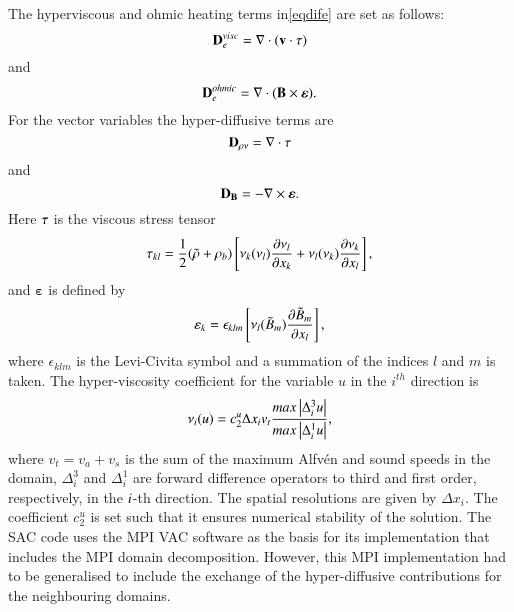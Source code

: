 \documentclass[final,1p]{elsarticle}
\begin{document}
The hyperviscous and ohmic heating terms in\eqref{eqdife} are set as follows:
\begin{equation}
{\bf D}_{e}^{visc}=\nabla \cdot ({\bf v}\cdot \tau )
\end{equation}
and
\begin{equation}
{\bf D}_{e}^{ohmic}=\nabla \cdot ({\bf B}\times \boldsymbol{\varepsilon} ).
\end{equation}
For the vector variables the hyper-diffusive terms are
\begin{equation}
{\bf D}_{\rho \nu}=\nabla \cdot {\bf \tau}
\end{equation}
and
\begin{equation}\label{eqdifb}
{\bf D}_{\bf B}= -\nabla \times {\boldsymbol{ \varepsilon}}.
\end{equation}
Here $ \bf \tau $ is the viscous stress tensor
\begin{equation}
\tau _{kl}={{1}\over{2}}(\tilde{\rho}+\rho _{b})\left[  \nu _{k}(\nu _{l}) {{\partial \nu_{l}}\over{\partial x_{k}}} +    \nu _{l}(\nu _{k}) {{\partial \nu_{k}}\over{\partial x_{l}}}     \right],
\end{equation}
and $  \boldsymbol{\varepsilon} $ is defined by
\begin{equation}
\varepsilon _{k}=\epsilon_{klm}\left[  \nu _{l}(\tilde{B}_{m})  {{\partial \tilde{B}_{m}}\over{\partial x_{l}}} \right],
\end{equation}
where $\epsilon_{klm}$ is the Levi-Civita symbol and a summation of the indices $l$ and $m$ is taken. The hyper-viscosity coefficient for the variable $u$ in the $i^{th}$ direction is
\begin{equation}\label{eqhyp}
\nu _{i}(u)=c_{2}^{u}\Delta x_{i}v_{t}{{max \left| \Delta_i^{3} u\right|}\over{max \left| \Delta _{i}^{1}u\right|}},
\end{equation}
where $v_{t}=v_{a}+v_{s}$ is the sum of the maximum Alfv\'{e}n and sound speeds in the domain, $\Delta^{3}_{i}$ and $\Delta^{1}_{i}$ are forward difference operators  to third and first order, respectively, in the $\it{i}$-th direction. The spatial resolutions are given by $\Delta x_{i}$. The coefficient $c_{2}^{u}$ is set such that it ensures numerical stability of the solution.
The SAC code uses the MPI VAC software as the basis for its implementation \cite{Toth1996} that includes the MPI domain decomposition. However, this MPI implementation had to be generalised to include the exchange of the hyper-diffusive contributions for the neighbouring domains. 
\end{document}
